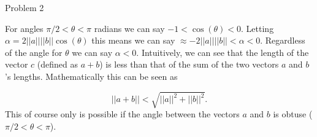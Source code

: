 \begin{problem}{Problem 2}
\begin{Highlight}
        For angles $\pi / 2 < \theta < \pi$ radians we can say $-1 < \cos{(\theta) < 0}$. Letting $\alpha = 2||a||||b||\cos{(\theta)}$ this means we can say $\approx -2||a||||b|| < \alpha < 0$. Regardless 
        of the angle for $\theta$ we can say $\alpha < 0$. Intuitively, we can see that the length of the vector $c$ (defined as $a+b$) is less than that of the sum of the two vectors $a$ and $b$'s 
        lengths. Mathematically this can be seen as

        \begin{equation}
            ||a + b|| < \sqrt{||a||^{2} + ||b||^{2}}.
        \end{equation}
        This of course only is possible if the angle between the vectors $a$ and $b$ is obtuse ($\pi / 2 < \theta < \pi$).
    \end{Highlight}
\end{problem}

